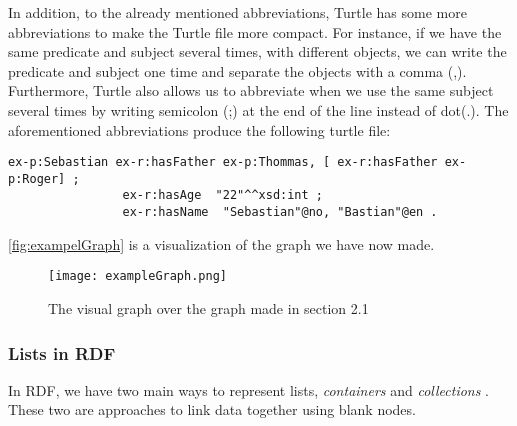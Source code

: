 \para
In addition, to the already mentioned abbreviations, Turtle has some more abbreviations to make the Turtle file more compact. For instance, if we have the same predicate and subject several times, with different objects, we can write the predicate and subject one time and separate the objects with a comma (,). Furthermore, Turtle also allows us to abbreviate when we use the same subject several times by writing semicolon (;) at the end of the line instead of dot(.). The aforementioned abbreviations produce the following turtle file:

\begin{lstlisting}[frame=single, language=turtle]
ex-p:Sebastian ex-r:hasFather ex-p:Thommas, [ ex-r:hasFather ex-p:Roger] ; 
                ex-r:hasAge  "22"^^xsd:int ; 
                ex-r:hasName  "Sebastian"@no, "Bastian"@en .
\end{lstlisting}
\autoref{fig:exampelGraph} is a visualization of the graph we have now made.

\begin{figure}
    \centering
    \texttt{[image: exampleGraph.png]}
    \caption{The visual graph over the graph made in section 2.1}
    \label{fig:exampelGraph}
\end{figure}

\subsubsection{Lists in RDF}
In RDF, we have two main ways to represent lists, \emph{containers} and \emph{collections} \autocite[58-63]{FOSWT}. These two are approaches to link data together using blank nodes.

